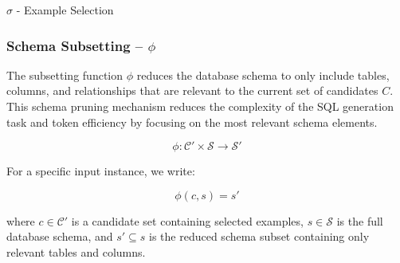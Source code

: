 \begin{algorithm}
\caption{$\sigma$ - Example Selection}\label{algorithms:sigma}
\begin{algorithmic}[1]
\end{algorithmic}
\end{algorithm}

\subsubsection{Schema Subsetting – $\phi$}\label{design:subsetting-function}

The subsetting function $\phi$ reduces the database schema to only include
tables, columns, and relationships that are relevant to the current set of candidates
$C$. This schema pruning mechanism reduces the complexity of the SQL generation task
and token efficiency by focusing on the most relevant schema elements.

$$
\phi: \mathcal{C}' \times \mathcal{S} \rightarrow \mathcal{S}'
$$

\vspace{0.5em}

For a specific input instance, we write:

$$
\phi(c, s) = s'
$$

\vspace{0.5em}

where $c \in \mathcal{C}'$ is a candidate set containing selected examples, $s \in \mathcal{S}$
is the full database schema, and $s' \subseteq s$ is the reduced schema subset containing
only relevant tables and columns.

